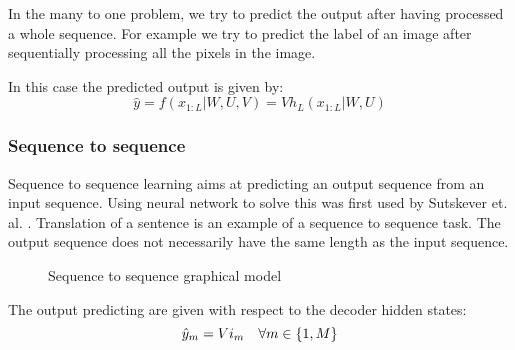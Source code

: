 \documentclass[11pt,oneside,openright]{report}
\begin{document}
In the many to one problem, we try to predict the output after having processed a whole sequence. For example we try to predict the label of an image after sequentially processing all the pixels in the image.

In this case the predicted output is given by:
$$ \hat{y} = f(x_{1:L}|W, U, V) = V h_L(x_{1:L}|W,U)$$

\subsubsection{Sequence to sequence}

Sequence to sequence learning aims at predicting an output sequence from an input sequence. Using neural network to solve this was first used by Sutskever et. al. \cite{s2s}. Translation of a sentence is an example of a sequence to sequence task. The output sequence does not necessarily have the same length as the input sequence.


\begin{figure}[H]
\centering
{}
\caption{Sequence to sequence graphical model}
\end{figure}

The output predicting are given with respect to the decoder hidden states:
\begin{equation}
          \hat{y}_{m} = V i_{m} \quad \forall m \in \{1, M\}\\
\end{equation}
\end{document}
